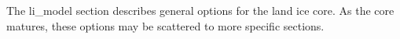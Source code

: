 The li\_model section describes general options for the land ice core.  As the core matures, these options may be scattered to more specific sections.
